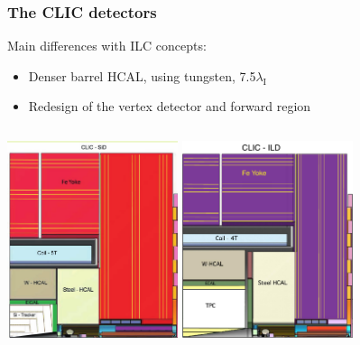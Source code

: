 \documentclass{beamer}
\begin{document}
\begin{frame}
\frametitle{The CLIC detectors}
Main differences with ILC concepts:
\begin{itemize}
  \item Denser barrel HCAL, using tungsten, 7.5$\lambda_{\textrm{I}}$
  \item Redesign of the vertex detector and forward region
\end{itemize}
\begin{columns}[c]
\column{6cm}
\centering
\includegraphics[width=5cm]{CLIC_SiD_xz.pdf}
\column{6cm}
\centering
\includegraphics[width=5cm]{CLIC_ILD_xz.pdf}
\end{columns}
\end{frame}
\end{document}
